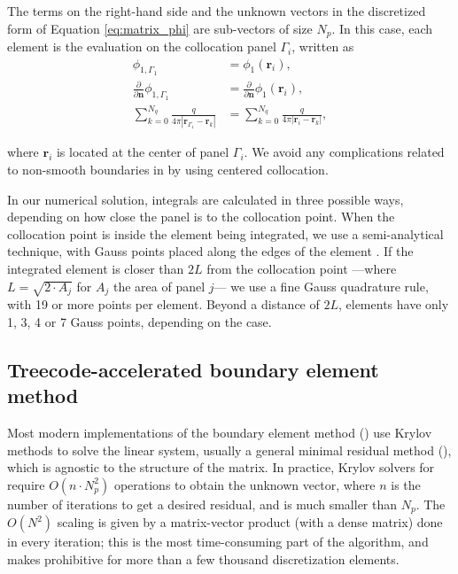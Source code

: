 The terms on the right-hand side and the unknown vectors in the discretized form of Equation \eqref{eq:matrix_phi} are sub-vectors of size $N_p$. In this case, each element is the evaluation on the collocation panel $\Gamma_i$, written as
%
\begin{align} \label{eq:vector_disc}
\phi_{1,\Gamma_1} &= \phi_1(\mathbf{r}_i), \nonumber \\
\frac{\partial}{\partial \mathbf{n}}\phi_{1,\Gamma_1} &= \frac{\partial}{\partial \mathbf{n}}\phi_1(\mathbf{r}_i), \nonumber \\
\sum_{k=0}^{N_q} \frac{q}{4\pi|\mathbf{r}_{\Gamma_1} - \mathbf{r}_k|} &= \sum_{k=0}^{N_q} \frac{q}{4\pi|\mathbf{r}_i - \mathbf{r}_k|},
\end{align}

\noindent where $\mathbf{r}_i$ is located at the center of panel $\Gamma_i$. We avoid any complications related to non-smooth boundaries in \bem by using centered collocation.


In our numerical solution, integrals are calculated in three possible ways, depending on how close the panel is to the collocation point. When the collocation point is inside the element being integrated, we use a semi-analytical technique, with Gauss points placed along the edges of the element \cite{HessSmith1967,ZhuHuangSongWhite2001}. If the integrated element is closer than $2L$ from the collocation point ---where $L = \sqrt{2\cdot A_j}$ for $A_j$ the area of panel $j$--- we use a fine Gauss quadrature rule, with 19 or more points per element. Beyond a distance of $2L$, elements have only 1, 3, 4 or 7 Gauss points, depending on the case.


\subsection{Treecode-accelerated boundary element method}

Most modern implementations of the boundary element method (\bem) use Krylov methods to solve the linear system, usually a general minimal residual method (\gmres), which is agnostic to the structure of the matrix. In practice, Krylov solvers for \bem require $O(n \cdot N_p^2)$ operations to obtain the unknown vector, where $n$ is the number of iterations to get a desired residual, and is much smaller than $N_p$. The $O(N^2)$ scaling is given by a matrix-vector product (with a dense matrix) done in every iteration; this is the most time-consuming part of the algorithm, and makes \bem prohibitive for more than a few thousand discretization elements. 

